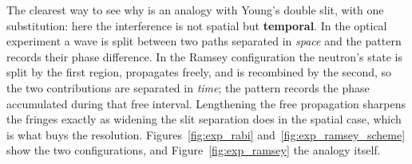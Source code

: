 \documentclass[a4paper,headsepline,oneside,11pt]{scrartcl}
\begin{document}
The clearest way to see why is an analogy with Young's double slit, with one
substitution: here the interference is not spatial but \textbf{temporal}. In the
optical experiment a wave is split between two paths separated in \emph{space}
and the pattern records their phase difference. In the Ramsey configuration the
neutron's state is split by the first region, propagates freely, and is
recombined by the second, so the two contributions are separated in
\emph{time}; the pattern records the phase accumulated during that free
interval. Lengthening the free propagation sharpens the fringes exactly as
widening the slit separation does in the spatial case, which is what buys the
resolution. Figures~\ref{fig:exp_rabi} and~\ref{fig:exp_ramsey_scheme} show the
two configurations, and Figure~\ref{fig:exp_ramsey} the analogy itself.
\end{document}
